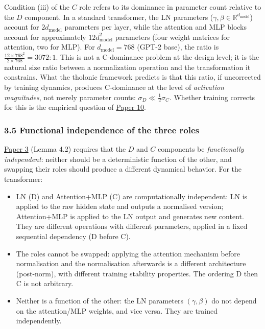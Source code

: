 \documentclass[
  11pt,
  letterpaper,
]{article}
\providecommand{\tightlist}{%
  \setlength{\itemsep}{0pt}\setlength{\parskip}{0pt}}
\begin{document}
Condition (iii) of the \(C\) role refers to its dominance in parameter
count relative to the \(D\) component. In a standard transformer, the LN
parameters (\(\gamma, \beta \in \mathbb{R}^{d_\text{model}}\)) account
for \(2d_\text{model}\) parameters per layer, while the attention and
MLP blocks account for approximately \(12d_\text{model}^2\) parameters
(four weight matrices for attention, two for MLP). For
\(d_\text{model} = 768\) (GPT-2 base), the ratio is
\(\frac{12 \times 768^2}{2 \times 768} = 3072 : 1\). This is not a
C-dominance problem at the design level; it is the natural size ratio
between a normalization operation and the transformation it constrains.
What the tholonic framework predicts is that this ratio, if uncorrected
by training dynamics, produces C-dominance at the level of
\emph{activation magnitudes}, not merely parameter counts:
\(\sigma_D \ll \frac{1}{2}\sigma_C\). Whether training corrects for this
is the empirical question of
\href{https://github.com/baardev/truevalue/blob/main/docnav/Research/papers/10_tholonic-neural-architecture/10_tholonic-neural-architecture.pdf}{Paper
10}.

\subsubsection{3.5 Functional independence of the three
roles}\label{functional-independence-of-the-three-roles}

\href{https://github.com/baardev/truevalue/blob/main/docnav/Research/papers/3_minimal-recursive-triadic-framework/3_minimal-recursive-triadic-framework.pdf}{Paper
3} (Lemma 4.2) requires that the \(D\) and \(C\) components be
\emph{functionally independent}: neither should be a deterministic
function of the other, and swapping their roles should produce a
different dynamical behavior. For the transformer:

\begin{itemize}
\tightlist
\item
  LN (D) and Attention+MLP (C) are computationally independent: LN is
  applied to the raw hidden state and outputs a normalised version;
  Attention+MLP is applied to the LN output and generates new content.
  They are different operations with different parameters, applied in a
  fixed sequential dependency (D before C).
\item
  The roles cannot be swapped: applying the attention mechanism before
  normalisation and the normalisation afterwards is a different
  architecture (post-norm), with different training stability
  properties. The ordering D then C is not arbitrary.
\item
  Neither is a function of the other: the LN parameters
  \((\gamma, \beta)\) do not depend on the attention/MLP weights, and
  vice versa. They are trained independently.
\end{itemize}
\end{document}
